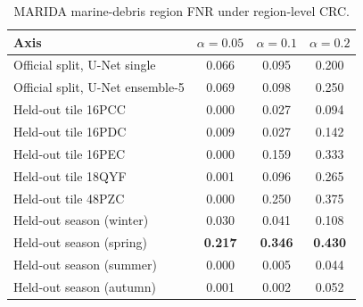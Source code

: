 \begin{table}[t]
\centering
\footnotesize
\setlength{\tabcolsep}{3pt}
\begin{tabular}{lccc}
\toprule
Axis & $\alpha=0.05$ & $\alpha=0.1$ & $\alpha=0.2$ \\
\midrule
Official split, U-Net single & 0.066 & 0.095 & 0.200 \\
Official split, U-Net ensemble-5 & 0.069 & 0.098 & 0.250 \\
\addlinespace
Held-out tile 16PCC & 0.000 & 0.027 & 0.094 \\
Held-out tile 16PDC & 0.009 & 0.027 & 0.142 \\
Held-out tile 16PEC & 0.000 & 0.159 & 0.333 \\
Held-out tile 18QYF & 0.001 & 0.096 & 0.265 \\
Held-out tile 48PZC & 0.000 & 0.250 & 0.375 \\
\addlinespace
Held-out season (winter) & 0.030 & 0.041 & 0.108 \\
Held-out season (spring) & \textbf{0.217} & \textbf{0.346} & \textbf{0.430} \\
Held-out season (summer) & 0.000 & 0.005 & 0.044 \\
Held-out season (autumn) & 0.001 & 0.002 & 0.052 \\
\bottomrule
\end{tabular}
\caption{MARIDA marine-debris region FNR under region-level CRC.}
\label{tab:marida}
\end{table}
